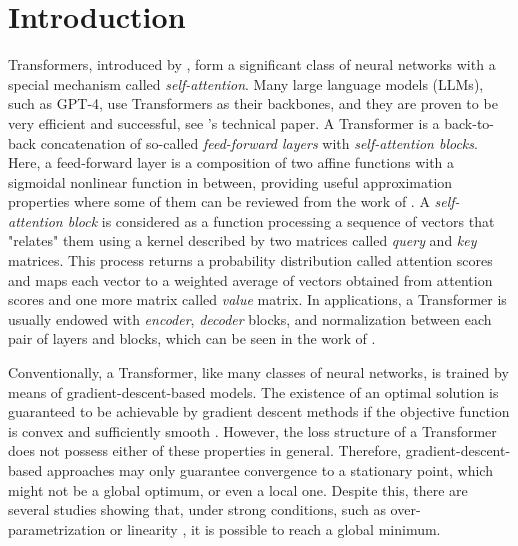 \documentclass[11pt]{article}
\begin{document}
\section{Introduction}
Transformers, introduced by \cite{vaswani2017attention}, form a significant class of neural networks with a special mechanism called \emph{self-attention}. Many large language models (LLMs), such as GPT-4, use Transformers as their backbones, and they are proven to be very efficient and successful, see \cite{achiam2023gpt}'s technical paper. A Transformer is a back-to-back concatenation of so-called \emph{feed-forward layers} with \emph{self-attention blocks}. Here, a feed-forward layer is a composition of two affine functions with a sigmoidal nonlinear function in between, providing useful approximation properties where some of them can be reviewed from the work of \cite{hornik1989multilayer}. A \emph{self-attention block} is considered as a function processing a sequence of vectors that "relates" them using a kernel described by two matrices called \emph{query} and \emph{key} matrices. This process returns a probability distribution called attention scores and maps each vector to a weighted average of vectors obtained from attention scores and one more matrix called \emph{value} matrix. In applications, a Transformer is usually endowed with \emph{encoder}, \emph{decoder} blocks, and normalization between each pair of layers and blocks, which can be seen in the work of \cite{vaswani2017attention}.

Conventionally, a Transformer, like many classes of neural networks, is trained by means of gradient-descent-based models. The existence of an optimal solution is guaranteed to be achievable by gradient descent methods if the objective function is convex and sufficiently smooth \cite[see Chapter 9]{boyd2004convex}. However, the loss structure of a Transformer does not possess either of these properties in general. Therefore, gradient-descent-based approaches may only guarantee convergence to a stationary point, which might not be a global optimum, or even a local one. Despite this, there are several studies showing that, under strong conditions, such as over-parametrization \citep{allen2019learning, du2018gradient} or linearity \citep{arora2018convergence}, it is possible to reach a global minimum. %
\end{document}

